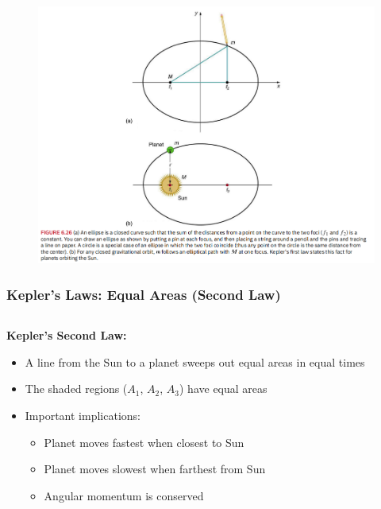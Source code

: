 \documentclass{beamer}
\begin{document}
\begin{frame}
\begin{figure}
    \centering
    \includegraphics[width=1\linewidth]{phys12-gravity-keplers-first-law.png}
\end{figure}
\end{frame}

\begin{frame}
\frametitle{Kepler's Laws: Equal Areas (Second Law)}
\begin{columns}
\begin{column}{0.6\textwidth}
\textbf{Kepler's Second Law:}
\begin{itemize}
    \item A line from the Sun to a planet sweeps out equal areas in equal times
    \item The shaded regions ($A_1$, $A_2$, $A_3$) have equal areas
    \item Important implications:
    \begin{itemize}
        \item Planet moves fastest when closest to Sun
        \item Planet moves slowest when farthest from Sun
        \item Angular momentum is conserved
    \end{itemize}
\end{itemize}
\end{column}
\begin{column}{0.4\textwidth}

\end{column}
\end{columns}
\end{frame}
\end{document}
